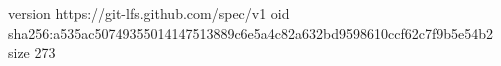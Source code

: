 version https://git-lfs.github.com/spec/v1
oid sha256:a535ac50749355014147513889c6e5a4c82a632bd9598610ccf62c7f9b5e54b2
size 273
